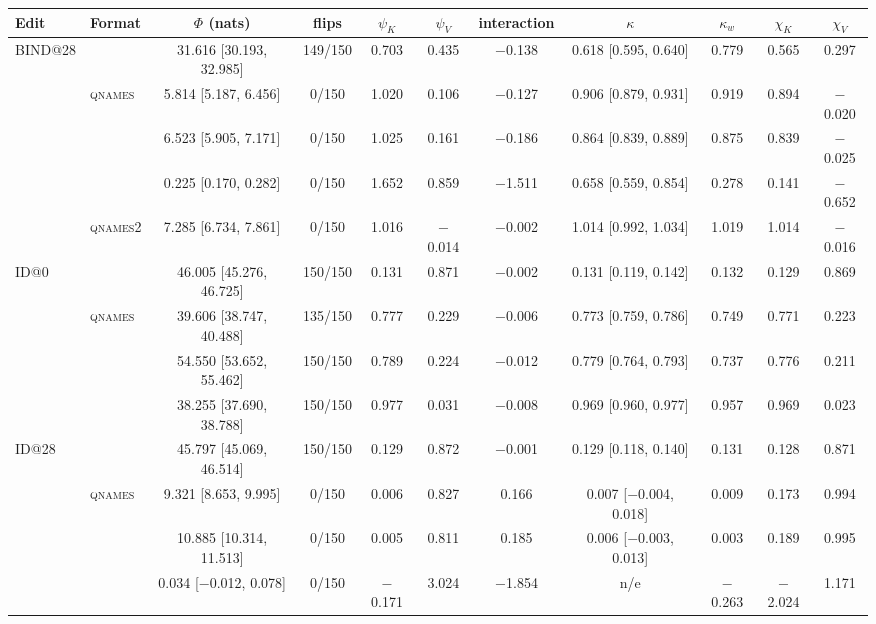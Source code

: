 \begin{tabular}{@{}llccccccccc@{}}
\toprule
Edit & Format & $\Phi$ (nats) & flips & $\psi_K$ & $\psi_V$ & interaction & $\kappa$ & $\kappa_w$ & $\chi_K$ & $\chi_V$ \\
\midrule
BIND@28 & \fmtNone{} & 31.616 [30.193, 32.985] & 149/150 & 0.703 & 0.435 & $-$0.138 & 0.618 [0.595, 0.640] & 0.779 & 0.565 & 0.297 \\
 & \textsc{qnames} & 5.814 [5.187, 6.456] & 0/150 & 1.020 & 0.106 & $-$0.127 & 0.906 [0.879, 0.931] & 0.919 & 0.894 & $-$0.020 \\
 & \fmtOpt{} & 6.523 [5.905, 7.171] & 0/150 & 1.025 & 0.161 & $-$0.186 & 0.864 [0.839, 0.889] & 0.875 & 0.839 & $-$0.025 \\
 & \fmtLetter{} & 0.225 [0.170, 0.282] & 0/150 & 1.652 & 0.859 & $-$1.511 & 0.658 [0.559, 0.854] & 0.278 & 0.141 & $-$0.652 \\
 & \textsc{qnames2} & 7.285 [6.734, 7.861] & 0/150 & 1.016 & $-$0.014 & $-$0.002 & 1.014 [0.992, 1.034] & 1.019 & 1.014 & $-$0.016 \\
\midrule
ID@0 & \fmtNone{} & 46.005 [45.276, 46.725] & 150/150 & 0.131 & 0.871 & $-$0.002 & 0.131 [0.119, 0.142] & 0.132 & 0.129 & 0.869 \\
 & \textsc{qnames} & 39.606 [38.747, 40.488] & 135/150 & 0.777 & 0.229 & $-$0.006 & 0.773 [0.759, 0.786] & 0.749 & 0.771 & 0.223 \\
 & \fmtOpt{} & 54.550 [53.652, 55.462] & 150/150 & 0.789 & 0.224 & $-$0.012 & 0.779 [0.764, 0.793] & 0.737 & 0.776 & 0.211 \\
 & \fmtLetter{} & 38.255 [37.690, 38.788] & 150/150 & 0.977 & 0.031 & $-$0.008 & 0.969 [0.960, 0.977] & 0.957 & 0.969 & 0.023 \\
\midrule
ID@28 & \fmtNone{} & 45.797 [45.069, 46.514] & 150/150 & 0.129 & 0.872 & $-$0.001 & 0.129 [0.118, 0.140] & 0.131 & 0.128 & 0.871 \\
 & \textsc{qnames} & 9.321 [8.653, 9.995] & 0/150 & 0.006 & 0.827 & 0.166 & 0.007 [$-$0.004, 0.018] & 0.009 & 0.173 & 0.994 \\
 & \fmtOpt{} & 10.885 [10.314, 11.513] & 0/150 & 0.005 & 0.811 & 0.185 & 0.006 [$-$0.003, 0.013] & 0.003 & 0.189 & 0.995 \\
 & \fmtLetter{} & 0.034 [$-$0.012, 0.078] & 0/150 & $-$0.171 & 3.024 & $-$1.854 & n/e & $-$0.263 & $-$2.024 & 1.171 \\
\bottomrule
\end{tabular}
